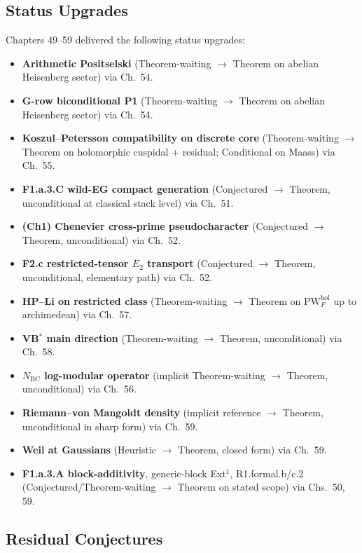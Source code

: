 \subsection{Status Upgrades}
\label{v4-arith:w5-synth:upgrades}

Chapters 49--59 delivered the following status upgrades:

\begin{itemize}
\item \textbf{Arithmetic Positselski} (Theorem-waiting \(\to\)
Theorem on abelian Heisenberg sector) via
Ch.~54.
\item \textbf{G-row biconditional P1} (Theorem-waiting \(\to\)
Theorem on abelian Heisenberg sector) via
Ch.~54.
\item \textbf{Koszul--Petersson compatibility on discrete core}
(Theorem-waiting \(\to\) Theorem on holomorphic cuspidal +
residual; Conditional on Maass) via Ch.~55.
\item \textbf{F1.a.3.C wild-EG compact generation} (Conjectured
\(\to\) Theorem, unconditional at classical stack level) via
Ch.~51.
\item \textbf{(Ch1) Chenevier cross-prime pseudocharacter}
(Conjectured \(\to\) Theorem, unconditional) via Ch.~52.
\item \textbf{F2.c restricted-tensor \(E_{2}\) transport}
(Conjectured \(\to\) Theorem, unconditional, elementary path) via
Ch.~52.
\item \textbf{HP--Li on restricted class} (Theorem-waiting \(\to\)
Theorem on \(\mathrm{PW}^{\mathrm{hol}}_{F}\) up to archimedean) via
Ch.~57.
\item \textbf{VB\(^{*}\) main direction} (Theorem-waiting \(\to\)
Theorem, unconditional) via Ch.~58.
\item \textbf{\(N_{\mathrm{BC}}\) log-modular operator} (implicit
Theorem-waiting \(\to\) Theorem, unconditional) via Ch.~56.
\item \textbf{Riemann--von Mangoldt density} (implicit reference
\(\to\) Theorem, unconditional in sharp form) via Ch.~59.
\item \textbf{Weil at Gaussians} (Heuristic \(\to\) Theorem, closed
form) via Ch.~59.
\item \textbf{F1.a.3.A block-additivity}, generic-block Ext\({}^{1}\),
R1.formal.b/c.2 (Conjectured/Theorem-waiting \(\to\) Theorem on
stated scope) via Chs.~50, 59.
\end{itemize}

\subsection{Residual Conjectures}
\label{v4-arith:w5-synth:residual-conjectures}

